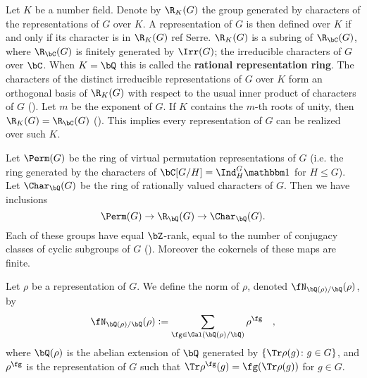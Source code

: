 
Let $K$ be a number field. Denote by $\R_K(G)$ the group generated by characters of the representations of $G$ over $K$. A representation of $G$ is then defined over $K$ if and only if its character is in $\R_K(G)$ {\color{red} ref Serre}.
$\R_K(G)$ is a subring of $\R_{\bC}(G)$, where $\R_{\bC}(G)$ is finitely generated by $\Irr(G)$; the irreducible characters of $G$ over $\bC$.
When $K = \bQ$ this is called the \textbf{rational representation ring}.
The characters of the distinct irreducible representations of $G$ over $K$ form an orthogonal basis of $\R_K(G)$ with respect to the usual inner product of characters of $G$ (\cite[Proposition 32]{Serre}).
Let $m$ be the exponent of $G$. If $K$ contains the $m$-th roots of unity, then $\R_K(G) = \R_{\bC}(G)$ (\cite[Theorem 24]{Serre}). This implies every representation of $G$ can be realized over such $K$. 
\vspace{1em}

Let $\Perm(G)$ be the ring of virtual permutation representations of $G$ (i.e. the ring generated by the characters of $\bC[G / H] = \Ind_{H}^G \trivial$ for $H \leq G$). Let $\Char_{\bQ}(G)$ be the ring of rationally valued characters of $G$. Then we have inclusions 
\[ \Perm(G) \to \R_{\bQ}(G) \to \Char_{\bQ}(G). \]
Each of these groups have equal $\bZ$-rank, equal to the number of conjugacy classes of cyclic subgroups of $G$ (\cite[Chapter 13, \S13.1]{Serre}). Moreover the cokernels of these maps are finite.

\begin{defn}\label{rho-norm}
    Let $\rho$ be a representation of $G$. We define the norm of $\rho$, denoted $\repnorm{\rho}$, by 
    \[
    \repnorm{\rho} \defeq \sum_{\fg \in \Gal(\bQ(\rho)/\bQ)}  \rho^\fg \quad,
    \]
    where $\bQ(\rho)$ is the abelian extension of $\bQ$ generated by $\{ \Tr \rho(g) \colon g \in G \}$, and $\rho^\fg$ is the representation of $G$ such that $\Tr \rho^{\fg}(g) = \fg(\Tr \rho(g))$ for $g \in G$. 
\end{defn}

